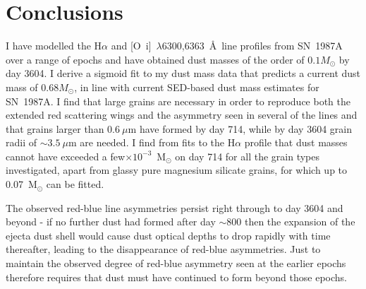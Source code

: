 \section{Conclusions}


I have modelled the H$\alpha$ and [O~{\sc i}]~$\lambda$6300,6363~\AA\ 
line profiles from SN~1987A over a range of epochs and have obtained dust 
masses of the order of $0.1M_{\odot}$ by day 3604.  I derive a sigmoid 
fit to my dust mass data that predicts a current dust mass of 
0.68$M_{\odot}$, in line with current SED-based dust mass estimates for 
SN~1987A.  I find that large grains are necessary in order to reproduce 
 both the extended red scattering wings and the asymmetry seen in 
several of the lines and that grains larger than $0.6~\mu$m have formed by 
day 714, while by day 3604 grain radii of $\sim 3.5~\mu$m are needed. I 
find from fits to the H$\alpha$ profile that dust masses cannot have 
exceeded a few$\times10^{-3}$~M$_\odot$ on day 714 for all the grain types 
investigated, apart from glassy pure magnesium silicate grains, for which 
up to 0.07~M$_\odot$ can be fitted.

The observed red-blue line asymmetries persist right through to day 3604 
and beyond - if no further dust had formed after day $\sim$800 then the 
expansion of the ejecta  dust shell would cause dust optical depths 
to drop rapidly with time thereafter, leading to the disappearance of 
red-blue asymmetries. Just to maintain the observed degree of red-blue 
asymmetry seen at the earlier epochs therefore requires that dust must 
have continued to form beyond those epochs.
